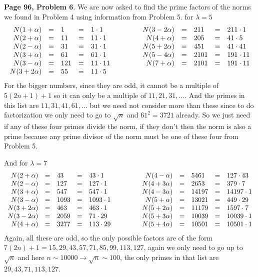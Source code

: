 \documentclass[aps,preprint,preprintnumbers,nofootinbib,showpacs,prd]{revtex4-1}
\newcommand{\nbea}{\begin{eqnarray*}}
\newcommand{\neea}{\end{eqnarray*}}
\begin{document}
{\bf Page 96, Problem 6}. We are now asked to find the prime factors of the norms we found in Problem 4 using information from Problem 5.
for $\lambda = 5$
%
\nbea
\begin{array}{r c l c l c r c l c l}
N(1 + \alpha) & = & 1 & = & 1 \cdot 1 & ~~~~~~~~ & N(3 -  2\alpha) & = & 211 & = & 211 \cdot 1 \\
N(2 + \alpha) & = & 11 & = & 11 \cdot 1 & ~~~~~~~~ & N(4 + \alpha) & = & 205 & = & 41 \cdot 5 \\
N(2 - \alpha) & = & 31 & = & 31 \cdot 1 & ~~~~~~~~ & N(5 + 2\alpha) & = & 451 & = & 41 \cdot 41 \\
N(3 + \alpha) & = & 61 & = & 61 \cdot 1 & ~~~~~~~~ & N(5 -  4\alpha) & = & 2101 & = & 191 \cdot 11 \\
N(3 - \alpha) & = & 121 & = & 11 \cdot 11 & ~~~~~~~~ & N(7 + \alpha) & = & 2101 & = & 191 \cdot 11 \\
N(3 + 2\alpha) & = & 55 & = & 11 \cdot 5 & ~~~~~~~~ & & &
\end{array}
\neea
%
For the bigger numbers, since they are odd, it cannot be a multiple of $5(2n+1) + 1$ so it can only be a multiple of $11, 21, 31, \dots$. And the primes in this list are $11, 31, 41, 61, \dots$ but we need not consider more than these since to do factorization we only need to go to $\sqrt{n}$ and $61^2 = 3721$ already. So we just need if any of these four primes divide the norm, if they don't then the norm is also a prime because any prime divisor of the norm must be one of these four from Problem 5.

And for $\lambda = 7$
%
\nbea
\begin{array}{r c l  c l c r c l c l}
N(2 + \alpha) & = & 43 & = & 43\cdot 1 & ~~~~~~~~ & N(4 - \alpha) & = & 5461 & = & 127 \cdot 43 \\
N(2 - \alpha) & = & 127 & = & 127 \cdot 1 & ~~~~~~~~ & N(4 + 3\alpha) & = & 2653 & = & 379 \cdot 7 \\
N(3 + \alpha) & = & 547 & = & 547 \cdot 1 & ~~~~~~~~ & N(4 - 3\alpha) & = & 14197 & = & 14197 \cdot 1 \\
N(3 - \alpha) & = & 1093 & = & 1093 \cdot 1 & ~~~~~~~~ & N(5 + \alpha) & = & 13021 & = & 449 \cdot 29 \\
N(3 + 2\alpha) & = & 463 & = & 463 \cdot 1 & ~~~~~~~~ & N(5 + 2\alpha) & = & 11179 & = & 1597 \cdot 7 \\
N(3 - 2\alpha) & = & 2059 & = & 71 \cdot 29 & ~~~~~~~~ & N(5 + 3\alpha) & = & 10039 & = & 10039 \cdot 1 \\
N(4 + \alpha) & = & 3277 & = & 113 \cdot 29 & ~~~~~~~~ & N(5 + 4\alpha) & = & 10501 & = & 10501 \cdot 1
\end{array}
\neea
%
Again, all these are odd, so the only possible factors are of the form $7(2n) + 1 = 15, 29, 43, 57, 71, 85, 99, 113, 127$, again we only need to go up to $\sqrt{n}$ and here $n \sim 10000 \to \sqrt{n} \sim 100$, the only primes in that list are $29, 43, 71, 113, 127$.
\end{document}

